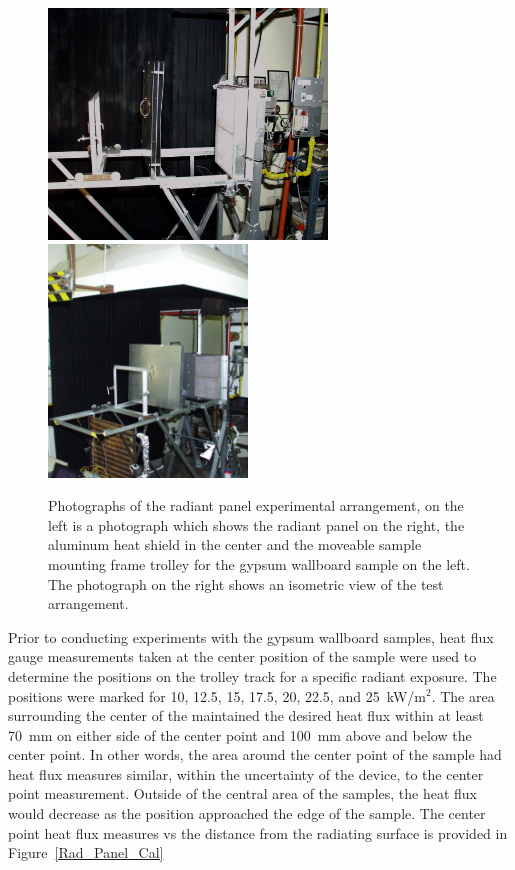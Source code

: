 \documentclass[twoside]{uocthesis}
\begin{document}
\begin{figure}
	\centering
	\includegraphics[width=2.92in]{../Figures/RAD_pan}
	\includegraphics[width=2.08in]{../Figures/RAD_pan_iso} \\
	\caption[Photographs of the radiant panel experimental arrangement]{Photographs of the radiant panel experimental arrangement, on the left is a photograph which shows the radiant panel on the right, the aluminum heat shield in the center and the moveable sample mounting frame trolley for the gypsum wallboard sample on the left.  The photograph on the right shows an isometric view of the test arrangement.}
	\label{Rad_Panel}
\end{figure}

Prior to conducting experiments with the gypsum wallboard samples, heat flux gauge measurements taken at the center position of the sample were used to determine the positions on the trolley track for a specific radiant exposure. The positions were marked for 10, 12.5, 15, 17.5, 20, 22.5, and 25~kW/m$^2$. The area surrounding the center of the maintained the desired heat flux within at least 70~mm on either side of the center point and 100~mm above and below the center point.  In other words, the area around the center point of the sample had heat flux measures similar, within the uncertainty of the device, to the center point measurement. Outside of the central area of the samples, the heat flux would decrease as the position approached the edge of the sample.  The center point heat flux measures vs the distance from the radiating surface is provided in Figure~\ref{Rad_Panel_Cal}   
\end{document}
